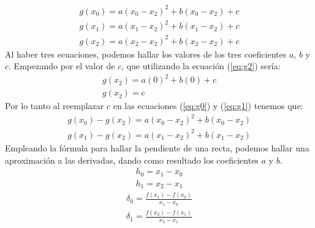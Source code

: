 \documentclass[ceqn,10pt]{SelfArx}
\begin{document}
\begin{equation} \label{eq:g0}
\begin{aligned}
	g(x_{0})=a(x_{0}-x_{2})^2+b(x_{0}-x_{2})+c
\end{aligned}
\end{equation}
\begin{equation} \label{eq:g1}
\begin{aligned}
	g(x_{1})=a(x_{1}-x_{2})^2+b(x_{1}-x_{2})+c
\end{aligned}
\end{equation}
\begin{equation} \label{eq:g2}
\begin{aligned}
	g(x_{2})=a(x_{2}-x_{2})^2+b(x_{2}-x_{2})+c
\end{aligned}
\end{equation}
Al haber tres ecuaciones, podemos hallar los valores de los tres coeficientes $a$, $b$ y $c$.
Empezando por el valor de $c$, que utilizando la ecuación (\ref*{eq:g2}) sería:
\begin{equation} \label{eq:g2S}
	\begin{aligned}
	g(x_{2})=a(0)^2+b(0)+c\\
	g(x_{2})=c
\end{aligned}
\end{equation}
Por lo tanto al reemplazar $c$ en las ecuaciones (\ref*{eq:g0}) y (\ref*{eq:g1}) tenemos que:
\begin{equation} \label{eq:despejeg0}
	\begin{aligned}
	g(x_{0})-g(x_{2})=a(x_{0}-x_{2})^2+b(x_{0}-x_{2})
\end{aligned}
\end{equation}
\begin{equation} \label{eq:despejeg1}
	\begin{aligned}
	g(x_{1})-g(x_{2})=a(x_{1}-x_{2})^2+b(x_{1}-x_{2})
\end{aligned}
\end{equation}
Empleando la fórmula para hallar la pendiente de una recta, podemos hallar
una aproximación a las derivadas, dando como resultado
los coeficientes $a$ y $b$.
\begin{equation} \label{eq:ecuacionesPendiente}
	\begin{aligned}
	h_{0}=x_{1}-x_{0}\\
	h_{1}=x_{2}-x_{1}
\end{aligned}
\end{equation}
\begin{equation} \label{eq:deltas}
	\begin{aligned}
	\delta_{0}= \frac{f(x_{1})-f(x_{0})}{x_{1}-x_{0}}\\
	\delta_{1}= \frac{f(x_{2})-f(x_{1})}{x_{2}-x_{1}}
\end{aligned}
\end{equation}
\end{document}
